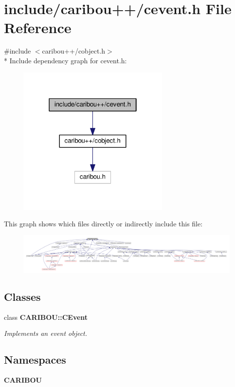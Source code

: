 \section{include/caribou++/cevent.h File Reference}
\label{cevent_8h}
{\ttfamily \#include $<$caribou++/cobject.\-h$>$}\\*
Include dependency graph for cevent.\-h\-:\nopagebreak
\begin{figure}[H]
\begin{center}
\leavevmode
\includegraphics[width=214pt]{cevent_8h__incl}
\end{center}
\end{figure}
This graph shows which files directly or indirectly include this file\-:\nopagebreak
\begin{figure}[H]
\begin{center}
\leavevmode
\includegraphics[width=350pt]{cevent_8h__dep__incl}
\end{center}
\end{figure}
\subsection*{Classes}
\begin{DoxyCompactItemize}
\item 
class {\bf C\-A\-R\-I\-B\-O\-U\-::\-C\-Event}
\begin{DoxyCompactList}\small\item\em Implements an event object. \end{DoxyCompactList}\end{DoxyCompactItemize}
\subsection*{Namespaces}
\begin{DoxyCompactItemize}
\item 
{\bf C\-A\-R\-I\-B\-O\-U}
\end{DoxyCompactItemize}
